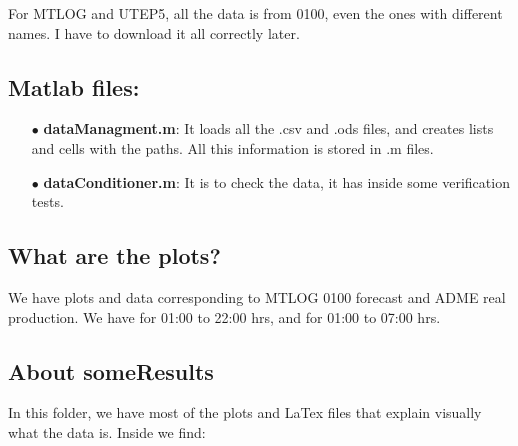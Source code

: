 \documentclass[12pt]{article}
\theoremstyle{definition}
\theoremstyle{remark}
\begin{document}
For MTLOG and UTEP5, all the data is from 0100, even the ones with different names. I have to download it all correctly later.

\subsection*{Matlab files:}

\begin{enumerate}

\item[$\bullet$] \textbf{dataManagment.m}: It loads all the .csv and .ods files, and creates lists and cells with the paths. All this information is stored in .m files.

\item[$\bullet$] \textbf{dataConditioner.m}: It is to check the data, it has inside some verification tests.

\end{enumerate}

\subsection*{What are the plots?}

We have plots and data corresponding to MTLOG 0100 forecast and ADME real production. We have for 01:00 to 22:00 hrs, and for 01:00 to 07:00 hrs.

\subsection*{About {\color{red}someResults}}

In this folder, we have most of the plots and LaTex files that explain visually what the data is. Inside we find:
\end{document}
